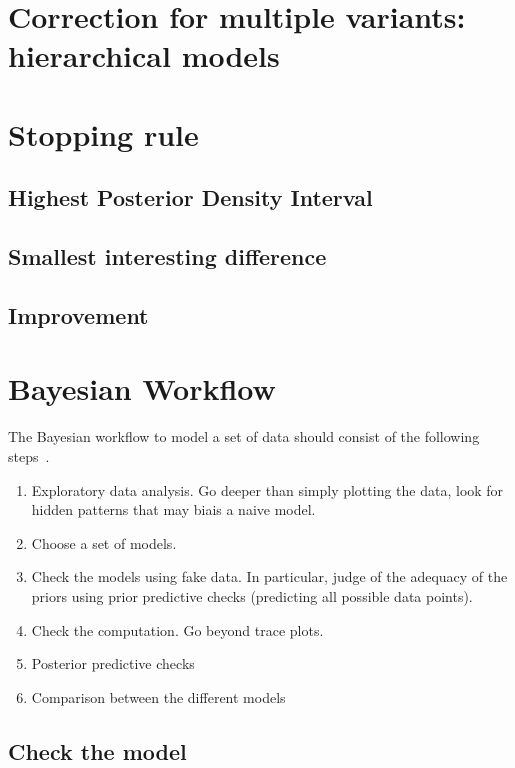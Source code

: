 \documentclass{tufte-book}
\begin{document}
\section{Correction for multiple variants: hierarchical models}

\section{Stopping rule}
\label{sec:Stopping rule}

\subsection{Highest Posterior Density Interval}

\subsection{Smallest interesting difference}

\subsection{Improvement}

\section{Bayesian Workflow}

The Bayesian workflow to model a set of data should consist of the following steps~\cite{Gabry2018}.

\begin{enumerate}
    \item Exploratory data analysis. Go deeper than simply plotting the data, look for hidden patterns that
      may biais a naive model.
    \item Choose a set of models.
    \item Check the models using fake data. In particular, judge of the adequacy of the priors using prior
      predictive checks (predicting all possible data points).
    \item Check the computation. Go beyond trace plots.
    \item Posterior predictive checks
    \item Comparison between the different models
\end{enumerate}

  \subsection{Check the model}
\end{document}
